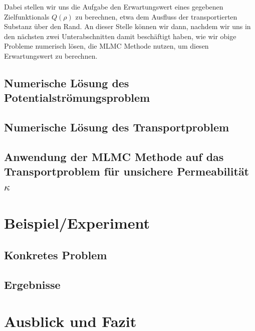 \documentclass[12pt,a4paper]{scrartcl}
\numberwithin{equation}{section}
\begin{document}
Dabei stellen wir uns die Aufgabe den Erwartungswert eines gegebenen Zielfunktionals $Q(\rho)$ zu berechnen, etwa dem Ausfluss der transportierten Substanz über den Rand. An dieser Stelle können wir dann, nachdem wir uns in den nächsten zwei Unterabschnitten damit beschäftigt haben, wie wir obige Probleme numerisch lösen, die MLMC Methode nutzen, um diesen Erwartungswert zu berechnen. 
 
\subsection{Numerische Lösung des Potentialströmungsproblem}
\subsection{Numerische Lösung des Transportproblem}
\subsection{Anwendung der MLMC Methode auf das Transportproblem für unsichere Permeabilität $\kappa$ }
\section{Beispiel/Experiment}
\subsection{Konkretes Problem}
\subsection{Ergebnisse}
\section{Ausblick und Fazit}

  \newpage

  
  
 
      

\newpage
  
 \thispagestyle{empty}


\vspace*{8cm}
\end{document}
